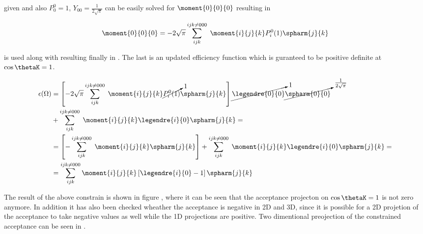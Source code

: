 \noindent given  and also $P_{0}^{0}=1$,  $Y_{00} = \frac{1}{2\sqrt{\pi}}$  can be 
easily solved for $\moment{0}{0}{0}$ resulting in 

\begin{center}
\begin{equation}
  \moment{0}{0}{0} = -2\sqrt{\pi} \sum_{ijk}^{ijk\neq 000} \; \moment{i}{j}{k} P_i^0(1) \spharm{j}{k}
  \label{eff_constr_mom}
\end{equation}
\end{center}

\noindent {} is used along with  resulting finally in . 
The last is an updated efficiency function which is guranteed to be positive definite at $\cos\thetaK=1$. 

\begin{center}
\begin{align}
  \epsilon(\Omega) &= \left[-2\sqrt{\pi} \sum_{ijk}^{ijk\neq 000} \; \moment{i}{j}{k} \cancelto{1}{P_i^0(1)} \spharm{j}{k} \right] \cancelto{1}{\legendre{0}{0}} \cancelto{\frac{1}{2\sqrt{\pi}}}{\spharm{0}{0}} \nonumber \\ 
                   &+ \sum_{ijk}^{ijk\neq 000} \; \moment{i}{j}{k} \legendre{i}{0} \spharm{j}{k} = \nonumber \\
                   &= \left[- \sum_{ijk}^{ijk\neq 000} \; \moment{i}{j}{k} \spharm{j}{k} \right] + \sum_{ijk}^{ijk\neq 000} \; \moment{i}{j}{k} \legendre{i}{0} \spharm{j}{k} = \nonumber\\
                   &= \sum_{ijk}^{ijk\neq 000} \moment{i}{j}{k} \left[ \legendre{i}{0} - 1 \right]\spharm{j}{k}
  \label{eff_func_final}
\end{align}
\end{center}

\noindent The result of the above constrain is shown in figure , where it can be seen that the acceptance projecton on $\cos\thetaK=1$
is not zero anymore. In addition it has also been checked wheather the acceptance is negative in 2D and 3D, since it is possible for a 2D
projetion of the acceptance to take negative values as well while the 1D projections are positive. Two dimentional preojection of the constrained acceptance 
can be seen in .

